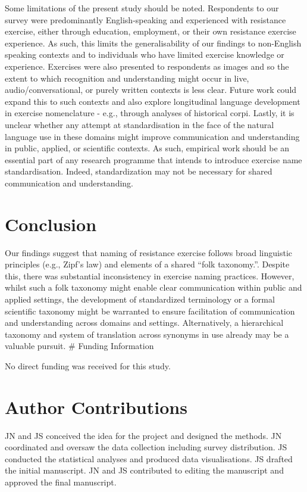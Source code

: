 \documentclass[
]{article}
\begin{document}
Some limitations of the present study should be noted. Respondents to
our survey were predominantly English-speaking and experienced with
resistance exercise, either through education, employment, or their own
resistance exercise experience. As such, this limits the
generalisability of our findings to non-English speaking contexts and to
individuals who have limited exercise knowledge or experience. Exercises
were also presented to respondents as images and so the extent to which
recognition and understanding might occur in live, audio/conversational,
or purely written contexts is less clear. Future work could expand this
to such contexts and also explore longitudinal language development in
exercise nomenclature - e.g., through analyses of historical corpi.
Lastly, it is unclear whether any attempt at standardisation in the face
of the natural language use in these domains might improve communication
and understanding in public, applied, or scientific contexts. As such,
empirical work should be an essential part of any research programme
that intends to introduce exercise name standardisation. Indeed,
standardization may not be necessary for shared communication and
understanding.

\section{Conclusion}\label{conclusion}

Our findings suggest that naming of resistance exercise follows broad
linguistic principles (e.g., Zipf's law) and elements of a shared ``folk
taxonomy.''. Despite this, there was substantial inconsistency in
exercise naming practices. However, whilst such a folk taxonomy might
enable clear communication within public and applied settings, the
development of standardized terminology or a formal scientific taxonomy
might be warranted to ensure facilitation of communication and
understanding across domains and settings. Alternatively, a hierarchical
taxonomy and system of translation across synonyms in use already may be
a valuable pursuit. \# Funding Information

No direct funding was received for this study.

\section{Author Contributions}\label{author-contributions}

JN and JS conceived the idea for the project and designed the methods.
JN coordinated and oversaw the data collection including survey
distribution. JS conducted the statistical analyses and produced data
visualisations. JS drafted the initial manuscript. JN and JS contributed
to editing the manuscript and approved the final manuscript.
\end{document}
